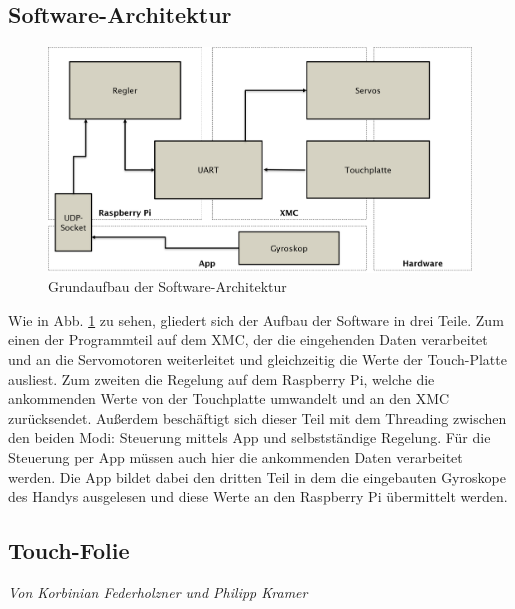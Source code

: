 \documentclass[12pt,a4paper,bibliography=totoc,listof=totoc]{scrartcl}
\begin{document}
\subsection{Software-Architektur}
\begin{figure}[htbp]
	\centering
	\includegraphics[scale = 0.5]{pics/SW_Architektur}
	\caption{Grundaufbau der Software-Architektur}
	\label{fig:SWarchitektur}
\end{figure}

Wie in Abb. \ref{fig:SWarchitektur} zu sehen, gliedert sich der Aufbau der Software in drei Teile. Zum einen der 
Programmteil auf dem XMC, der die eingehenden Daten verarbeitet und an die Servomotoren weiterleitet und 
gleichzeitig die Werte der Touch-Platte ausliest. Zum zweiten die Regelung auf dem Raspberry Pi, welche 
die ankommenden Werte von der Touchplatte umwandelt und an den XMC zurücksendet. Außerdem beschäftigt sich 
dieser Teil mit dem Threading zwischen den beiden Modi: Steuerung mittels App und selbstständige Regelung.  
Für die Steuerung per App müssen auch hier die ankommenden Daten verarbeitet werden. Die App bildet dabei 
den dritten Teil in dem die eingebauten Gyroskope des Handys ausgelesen und diese Werte an den Raspberry Pi 
übermittelt werden.
\subsection{Touch-Folie} \label{subsec:Touch-Folie}
\textit{Von Korbinian Federholzner und Philipp Kramer}\newline
\end{document}
